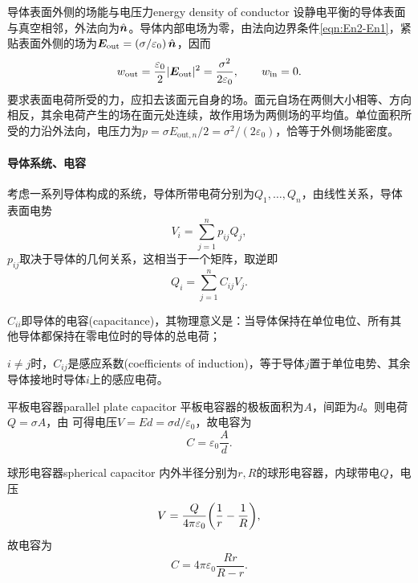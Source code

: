 \begin{example}{导体表面外侧的场能与电压力}{energy density of conductor}
    设静电平衡的导体表面与真空相邻，外法向为$\mathop{}\!\hat{\bm{n}}$。导体内部电场为零，由法向边界条件\eqref{eqn:En2-En1}，紧贴表面外侧的场为$\bm E_\mathrm{out} = (\sigma/\varepsilon_0)\mathop{}\!\hat{\bm{n}}$，因而
    \[
        w_\mathrm{out} = \frac{\varepsilon_0}2\lvert\bm E_\mathrm{out}\rvert^2
        = \frac{\sigma^2}{2\varepsilon_0},\qquad w_\mathrm{in} = 0 .
    \]
    要求表面电荷所受的力，应扣去该面元自身的场。面元自场在两侧大小相等、方向相反，其余电荷产生的场在面元处连续，故作用场为两侧场的平均值。单位面积所受的力沿外法向，电压力为$p = \sigma E_{\mathrm{out},n}/2 = \sigma^2/(2\varepsilon_0)$，恰等于外侧场能密度。
\end{example}

\paragraph{导体系统、电容}
考虑一系列导体构成的系统，导体所带电荷分别为$Q_1,\ldots,Q_n$，由线性关系，导体表面电势
\begin{equation}
    \label{eq:ed-potential-coefficients}
    V_i = \sum_{j=1}^np_{ij}Q_j,
\end{equation}
$p_{ij}$取决于导体的几何关系，这相当于一个矩阵，取逆即
\begin{equation}
    Q_i = \sum_{j=1}^nC_{ij}V_j.
\end{equation}
\begin{compactitem}
	\item $C_{ii}$即导体的电容(capacitance)，其物理意义是：当导体保持在单位电位、所有其他导体都保持在零电位时的导体的总电荷；
	\item $i \ne j$时，$C_{ij}$是感应系数(coefficients of induction)，等于导体$j$置于单位电势、其余导体接地时导体$i$上的感应电荷。
\end{compactitem}

\begin{example}
    {平板电容器}{parallel plate capacitor}
    平板电容器的极板面积为$A$，间距为$d$。则电荷$Q = \sigma A$，由 可得电压$V = Ed = \sigma d/\varepsilon_0$，故电容为
    \begin{equation}
        C = \varepsilon_0\frac Ad.
    \end{equation}
\end{example}

\begin{example}
    {球形电容器}{spherical capacitor}
    内外半径分别为$r,R$的球形电容器，内球带电$Q$，电压
    \[
        V = \frac Q{4\pi\varepsilon_0}\biggl(\frac1r - \frac1R\biggr),
    \]
    故电容为
    \begin{equation}
        C = 4\pi\varepsilon_0\frac{Rr}{R - r}.
    \end{equation}
\end{example}

